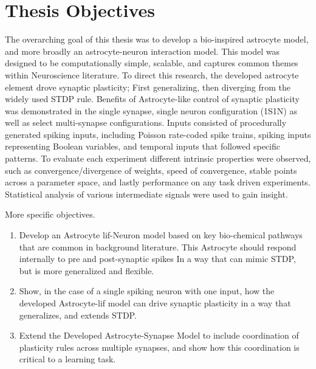 \section{Thesis Objectives}
The overarching goal of this thesis was to develop a bio-inspired astrocyte
model, and more broadly an astrocyte-neuron interaction model. This model was
designed to be computationally simple, scalable, and captures common themes
within Neuroscience literature. To direct this research, the developed astrocyte
element drove synaptic plasticity; First generalizing, then diverging from the
widely used STDP rule. Benefits of Astrocyte-like control of synaptic plasticity
was demonstrated in the single synapse, single neuron configuration (1S1N) as
well as select multi-synapse configurations. Inputs consisted of procedurally
generated spiking inputs, including Poisson rate-coded spike trains, spiking
inputs representing Boolean variables, and temporal inputs that followed
specific patterns. To evaluate each experiment different intrinsic properties
were observed, such as convergence/divergence of weights, speed of convergence,
stable points across a parameter space, and lastly performance on any task
driven experiments. Statistical analysis of various intermediate signals were
used to gain insight.

More specific objectives.
\begin{enumerate}
\item Develop an Astrocyte \Gls{lif}-Neuron model based on key bio-chemical
  pathways that are common in background literature. This Astrocyte should
  respond internally to pre and post-synaptic spikes In a way that can mimic
  STDP, but is more generalized and flexible.

  \item Show, in the case of a single spiking neuron with one input, how the
    developed Astrocyte-\Gls{lif} model can drive synaptic plasticity in a way that
    generalizes, and extends STDP.

  \item Extend the Developed Astrocyte-Synapse Model to include coordination of
    plasticity rules across multiple synapses, and show how this coordination is
    critical to a learning task.

\end{enumerate}
